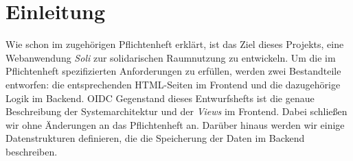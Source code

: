 
\chapter{Einleitung}
\label{ch:preface}




Wie schon im zugehörigen Pflichtenheft erklärt, ist das Ziel dieses Projekts, eine Webanwendung \textit{Soli} zur solidarischen Raumnutzung zu entwickeln.
Um die im Pflichtenheft spezifizierten Anforderungen zu erfüllen, werden zwei Bestandteile entworfen: die entsprechenden HTML-Seiten im Frontend und die dazugehörige Logik im Backend. \gls{OIDC}
Gegenstand dieses Entwurfshefts ist die genaue Beschreibung der Systemarchitektur und der \textit{Views} im Frontend.
Dabei schließen wir ohne Änderungen an das Pflichtenheft an.
Darüber hinaus werden wir einige Datenstrukturen definieren, die die Speicherung der Daten im Backend beschreiben.